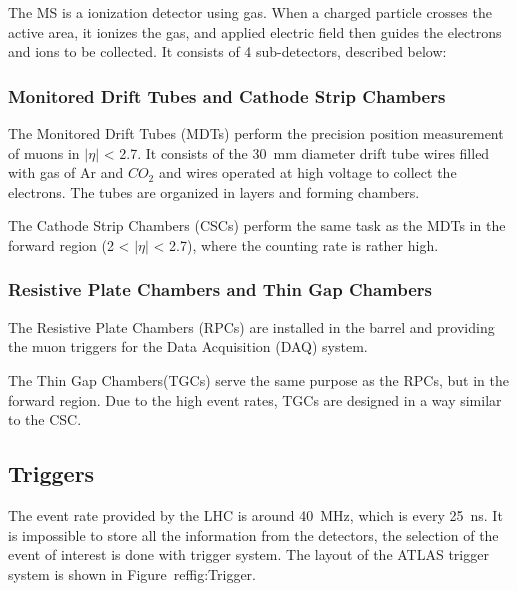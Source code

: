 The MS is a ionization detector using gas. When a charged particle crosses the active area, it ionizes the gas, and applied electric field then guides the electrons and ions to be collected. It consists of 4 sub-detectors, described below:

\subsubsection{Monitored Drift Tubes and Cathode Strip Chambers}
The Monitored Drift Tubes (MDTs) perform the precision position measurement of muons 
in $|\eta|$ < 2.7. It consists of the 30~mm diameter drift tube wires filled with gas of Ar and $CO_2$ and wires operated at high voltage to collect the electrons.
The tubes are organized in layers and forming chambers.

The Cathode Strip Chambers (CSCs) perform the same task as the MDTs in the forward region (2 < $|\eta|$ < 2.7), where the counting rate is rather high. 

\subsubsection{Resistive Plate Chambers and Thin Gap Chambers}
The Resistive Plate Chambers (RPCs) are installed in the barrel and providing the muon triggers for the Data Acquisition (DAQ) system.

The Thin Gap Chambers(TGCs) serve the same purpose as the RPCs, but in the forward region. Due to the high event rates, TGCs are designed in a way similar to the CSC.

\subsection{Triggers}
The event rate provided by the LHC is around 40~MHz, which is every 25~ns. It is impossible to store all the information from the detectors, the selection of the event of interest is done with trigger system. The layout of the ATLAS trigger system is shown in Figure~ref{fig:Trigger}.

